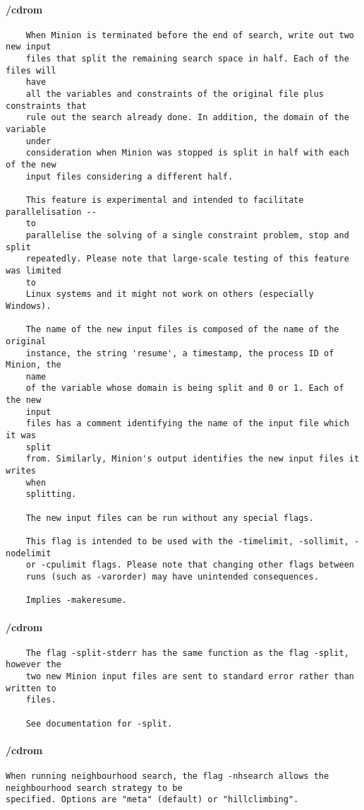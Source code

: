 \paragraph{/cdrom}
{\footnotesize
\begin{verbatim}
    When Minion is terminated before the end of search, write out two new input
    files that split the remaining search space in half. Each of the files will
    have
    all the variables and constraints of the original file plus constraints that
    rule out the search already done. In addition, the domain of the variable
    under
    consideration when Minion was stopped is split in half with each of the new
    input files considering a different half.

    This feature is experimental and intended to facilitate parallelisation --
    to
    parallelise the solving of a single constraint problem, stop and split
    repeatedly. Please note that large-scale testing of this feature was limited
    to
    Linux systems and it might not work on others (especially Windows).

    The name of the new input files is composed of the name of the original
    instance, the string 'resume', a timestamp, the process ID of Minion, the
    name
    of the variable whose domain is being split and 0 or 1. Each of the new
    input
    files has a comment identifying the name of the input file which it was
    split
    from. Similarly, Minion's output identifies the new input files it writes
    when
    splitting.

    The new input files can be run without any special flags.

    This flag is intended to be used with the -timelimit, -sollimit, -nodelimit
    or -cpulimit flags. Please note that changing other flags between
    runs (such as -varorder) may have unintended consequences.

    Implies -makeresume.
\end{verbatim}
}
\paragraph{/cdrom}
{\footnotesize
\begin{verbatim}
    The flag -split-stderr has the same function as the flag -split, however the
    two new Minion input files are sent to standard error rather than written to
    files.

    See documentation for -split.
\end{verbatim}
}
\paragraph{/cdrom}
{\footnotesize
\begin{verbatim}
When running neighbourhood search, the flag -nhsearch allows the neighbourhood search strategy to be
specified. Options are "meta" (default) or "hillclimbing".
\end{verbatim}
}
